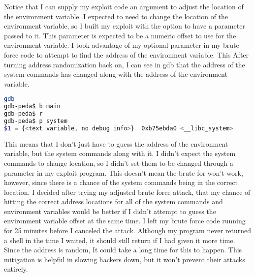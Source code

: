 \documentclass[14pt]{extarticle}
\begin{document}
Notice that I can supply my exploit code an argument to adjust the location of the environment variable. I expected to need to change the location of the environment variable, so I built my exploit with the option to have a parameter passed to it. This parameter is expected to be a numeric offset to use for the environment variable. I took advantage of my optional parameter in my brute force code to attempt to find the address of the environment variable.
This After turning address randomization back on, I can see in gdb that the address of the system commands has changed along with the address of the environment variable.
\begin{lstlisting}[language=sh]
gdb
gdb-peda$ b main
gdb-peda$ r
gdb-peda$ p system
$1 = {<text variable, no debug info>}  0xb75ebda0 <__libc_system>
\end{lstlisting}
This means that I don't just have to guess the address of the environment variable, but the system commands along with it. I didn't expect the system commands to change location, so I didn't set them to be changed through a parameter in my exploit program. This doesn't mean the brute for won't work, however, since there is a chance of the system commands being in the correct location. I decided after trying my adjusted brute force attack, that my chance of hitting the correct address locations for all of the  system commands and environment variables would be better if I didn't attempt to guess the environment variable offset at the same time.
I left my brute force code running for 25 minutes before I canceled the attack. Although my program never returned a shell in the time I waited, it should still return if I had given it more time. Since the address is random, It could take a long time for this to happen. This mitigation is helpful in slowing hackers down, but it won't prevent their attacks entirely.
\end{document}
